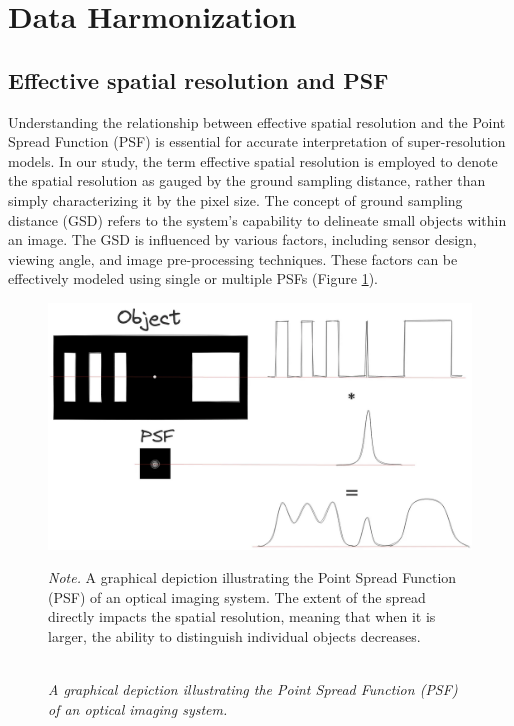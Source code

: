 \section{Data Harmonization}

\subsection{Effective spatial resolution and PSF}

Understanding the relationship between effective spatial resolution and the Point Spread Function (PSF) is essential for accurate interpretation of super-resolution models. In our study, the term effective spatial resolution is employed to denote the spatial resolution as gauged by the ground sampling distance, rather than simply characterizing it by the pixel size. The concept of ground sampling distance (GSD) refers to the system's capability to delineate small objects within an image. The GSD is influenced by various factors, including sensor design, viewing angle, and image pre-processing techniques. These factors can be effectively modeled using single or multiple PSFs (Figure \ref{fig:psf}).


\begin{figure}[H] 
    \caption{\doublespacing \\ \textit{A graphical depiction illustrating the Point Spread Function (PSF) of an optical imaging system.}} 
    \centering
    \includegraphics[width=1\linewidth]{images/csaybar_new_fig01.png}
    \begin{justify}
        \textit{Note.} A graphical depiction illustrating the Point Spread Function (PSF) of an optical imaging system. The extent of the spread directly impacts the spatial resolution, meaning that when it is larger, the ability to distinguish individual objects decreases.
    \end{justify}                    
    \label{fig:psf}
\end{figure}


